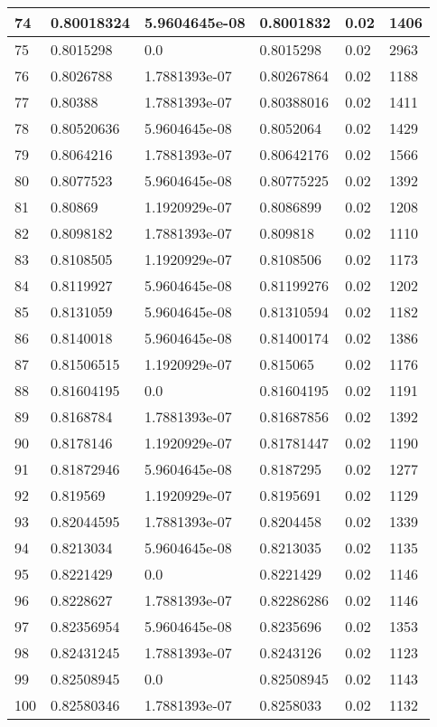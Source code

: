 \begin{longtable}{|l|l|l|l|l|l|}
74 & 0.80018324 & 5.9604645e-08 & 0.8001832 & 0.02 & 1406 \\ \hline 
75 & 0.8015298 & 0.0 & 0.8015298 & 0.02 & 2963 \\ \hline 
76 & 0.8026788 & 1.7881393e-07 & 0.80267864 & 0.02 & 1188 \\ \hline 
77 & 0.80388 & 1.7881393e-07 & 0.80388016 & 0.02 & 1411 \\ \hline 
78 & 0.80520636 & 5.9604645e-08 & 0.8052064 & 0.02 & 1429 \\ \hline 
79 & 0.8064216 & 1.7881393e-07 & 0.80642176 & 0.02 & 1566 \\ \hline 
80 & 0.8077523 & 5.9604645e-08 & 0.80775225 & 0.02 & 1392 \\ \hline 
81 & 0.80869 & 1.1920929e-07 & 0.8086899 & 0.02 & 1208 \\ \hline 
82 & 0.8098182 & 1.7881393e-07 & 0.809818 & 0.02 & 1110 \\ \hline 
83 & 0.8108505 & 1.1920929e-07 & 0.8108506 & 0.02 & 1173 \\ \hline 
84 & 0.8119927 & 5.9604645e-08 & 0.81199276 & 0.02 & 1202 \\ \hline 
85 & 0.8131059 & 5.9604645e-08 & 0.81310594 & 0.02 & 1182 \\ \hline 
86 & 0.8140018 & 5.9604645e-08 & 0.81400174 & 0.02 & 1386 \\ \hline 
87 & 0.81506515 & 1.1920929e-07 & 0.815065 & 0.02 & 1176 \\ \hline 
88 & 0.81604195 & 0.0 & 0.81604195 & 0.02 & 1191 \\ \hline 
89 & 0.8168784 & 1.7881393e-07 & 0.81687856 & 0.02 & 1392 \\ \hline 
90 & 0.8178146 & 1.1920929e-07 & 0.81781447 & 0.02 & 1190 \\ \hline 
91 & 0.81872946 & 5.9604645e-08 & 0.8187295 & 0.02 & 1277 \\ \hline 
92 & 0.819569 & 1.1920929e-07 & 0.8195691 & 0.02 & 1129 \\ \hline 
93 & 0.82044595 & 1.7881393e-07 & 0.8204458 & 0.02 & 1339 \\ \hline 
94 & 0.8213034 & 5.9604645e-08 & 0.8213035 & 0.02 & 1135 \\ \hline 
95 & 0.8221429 & 0.0 & 0.8221429 & 0.02 & 1146 \\ \hline 
96 & 0.8228627 & 1.7881393e-07 & 0.82286286 & 0.02 & 1146 \\ \hline 
97 & 0.82356954 & 5.9604645e-08 & 0.8235696 & 0.02 & 1353 \\ \hline 
98 & 0.82431245 & 1.7881393e-07 & 0.8243126 & 0.02 & 1123 \\ \hline 
99 & 0.82508945 & 0.0 & 0.82508945 & 0.02 & 1143 \\ \hline 
100 & 0.82580346 & 1.7881393e-07 & 0.8258033 & 0.02 & 1132 \\ \hline 
\end{longtable}